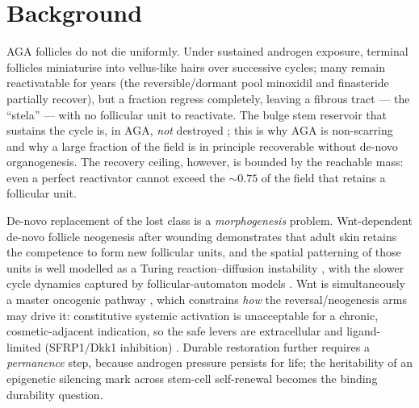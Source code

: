 \documentclass[11pt,a4paper]{article}
\begin{document}
\section{Background}
\label{sec:bg}
AGA follicles do not die uniformly. Under sustained androgen exposure, terminal
follicles miniaturise into vellus-like hairs over successive cycles; many remain
reactivatable for years (the reversible/dormant pool minoxidil and finasteride
partially recover), but a fraction regress completely, leaving a fibrous tract --- the
``stela'' --- with no follicular unit to reactivate. The bulge stem reservoir that
sustains the cycle is, in AGA, \emph{not} destroyed \citep{cotsarelis1990}; this is why
AGA is non-scarring and why a large fraction of the field is in principle recoverable
without de-novo organogenesis. The recovery ceiling, however, is bounded by the
reachable mass: even a perfect reactivator cannot exceed the $\sim\!0.75$ of the field
that retains a follicular unit.

De-novo replacement of the lost class is a \emph{morphogenesis} problem. Wnt-dependent
de-novo follicle neogenesis after wounding \citep{ito2007} demonstrates that adult skin
retains the competence to form new follicular units, and the spatial patterning of
those units is well modelled as a Turing reaction--diffusion instability
\citep{turing1952}, with the slower cycle dynamics captured by follicular-automaton
models \citep{halloy2000}. Wnt is simultaneously a master oncogenic pathway
\citep{clevers2012}, which constrains \emph{how} the reversal/neogenesis arms may drive
it: constitutive systemic activation is unacceptable for a chronic, cosmetic-adjacent
indication, so the safe levers are extracellular and ligand-limited
(SFRP1/Dkk1 inhibition) \citep{hawkshaw2018}. Durable restoration further requires a
\emph{permanence} step, because androgen pressure persists for life; the heritability of
an epigenetic silencing mark across stem-cell self-renewal becomes the binding
durability question.
\end{document}

